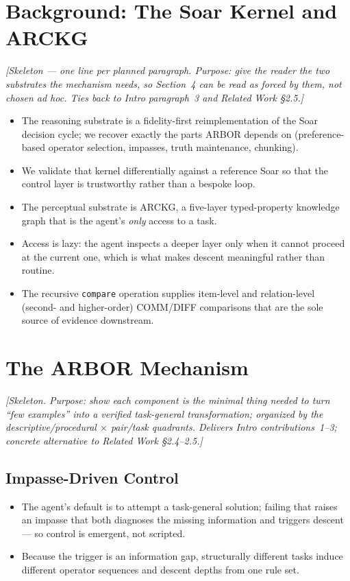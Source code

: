 \documentclass[letterpaper]{article} %
\begin{document}

\section{Background: The Soar Kernel and ARCKG}
\emph{[Skeleton --- one line per planned paragraph. Purpose: give the reader the
two substrates the mechanism needs, so Section~4 can be read as forced by them,
not chosen ad hoc. Ties back to Intro paragraph~3 and Related Work \S2.5.]}
\begin{itemize}
\item The reasoning substrate is a fidelity-first reimplementation of the Soar
decision cycle; we recover exactly the parts ARBOR depends on (preference-based
operator selection, impasses, truth maintenance, chunking).
\item We validate that kernel differentially against a reference Soar so that
the control layer is trustworthy rather than a bespoke loop.
\item The perceptual substrate is ARCKG, a five-layer typed-property knowledge
graph that is the agent's \emph{only} access to a task.
\item Access is lazy: the agent inspects a deeper layer only when it cannot
proceed at the current one, which is what makes descent meaningful rather than
routine.
\item The recursive \texttt{compare} operation supplies item-level and
relation-level (second- and higher-order) COMM/DIFF comparisons that are the sole
source of evidence downstream.
\end{itemize}

\section{The ARBOR Mechanism}
\emph{[Skeleton. Purpose: show each component is the minimal thing needed to turn
``few examples'' into a verified task-general transformation; organized by the
descriptive/procedural $\times$ pair/task quadrants. Delivers Intro
contributions~1--3; concrete alternative to Related Work \S2.4--2.5.]}

\subsection{Impasse-Driven Control}
\begin{itemize}
\item The agent's default is to attempt a task-general solution; failing that
raises an impasse that both diagnoses the missing information and triggers
descent --- so control is emergent, not scripted.
\item Because the trigger is an information gap, structurally different tasks
induce different operator sequences and descent depths from one rule set.
\end{itemize}
\end{document}
